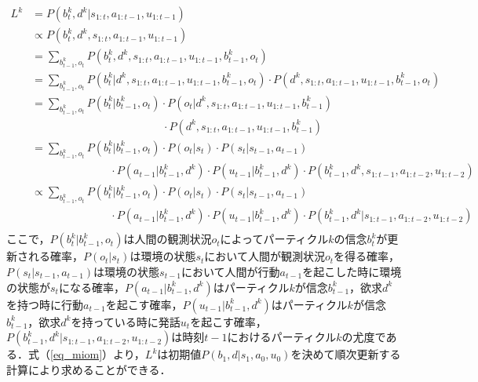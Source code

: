 \begin{equation}
  \begin{split}
  \label{eq_miom}
  L^k&=P(b_t^k,d^k|s_{1:t},a_{1:t-1},u_{1:t-1})\\
  &\propto P(b_t^k,d^k,s_{1:t},a_{1:t-1},u_{1:t-1})\\
  &= \sum_{b_{t-1}^k,o_t}P(b_t^k,d^k,s_{1:t},a_{1:t-1},u_{1:t-1},b_{t-1}^k,o_t)\\
  &= \sum_{b_{t-1}^k,o_t}P(b_t^k|d^k,s_{1:t},a_{1:t-1},u_{1:t-1},b_{t-1}^k,o_t)\cdot P(d^k,s_{1:t},a_{1:t-1},u_{1:t-1},b_{t-1}^k,o_t)\\
  &= \sum_{b_{t-1}^k,o_t}P(b_t^k|b_{t-1}^k,o_t)\cdot P(o_t|d^k,s_{1:t},a_{1:t-1},u_{1:t-1},b_{t-1}^k)\\
  &\hspace{5cm} \cdot P(d^k,s_{1:t},a_{1:t-1},u_{1:t-1},b_{t-1}^k)\\
  &= \sum_{b_{t-1}^k,o_t}P(b_t^k|b_{t-1}^k,o_t)\cdot P(o_t|s_t)\cdot P(s_t|s_{t-1},a_{t-1})\\
  &\hspace{3cm} \cdot P(a_{t-1}|b_{t-1}^k,d^k)\cdot P(u_{t-1}|b_{t-1}^k,d^k)\cdot P(b_{t-1}^k,d^k,s_{1:t-1},a_{1:t-2},u_{1:t-2})\\
  &\propto \sum_{b_{t-1}^k,o_t}P(b_t^k|b_{t-1}^k,o_t)\cdot P(o_t|s_t)\cdot P(s_t|s_{t-1},a_{t-1})\\
  &\hspace{3cm} \cdot P(a_{t-1}|b_{t-1}^k,d^k)\cdot P(u_{t-1}|b_{t-1}^k,d^k)\cdot P(b_{t-1}^k,d^k|s_{1:t-1},a_{1:t-2},u_{1:t-2})\\
  \end{split}
\end{equation}
ここで，$P(b_t^k|b_{t-1}^k,o_t)$は人間の観測状況$o_t$によってパーティクル$k$の信念$b_t^k$が更新される確率，$P(o_t|s_t)$は環境の状態$s_t$において人間が観測状況$o_t$を得る確率，$P(s_t|s_{t-1},a_{t-1})$は環境の状態$s_{t-1}$において人間が行動$a_{t-1}$を起こした時に環境の状態が$s_{t}$になる確率，$P(a_{t-1}|b_{t-1}^k,d^k)$はパーティクル$k$が信念$b_{t-1}^k$，欲求$d^k$を持つ時に行動$a_{t-1}$を起こす確率，$P(u_{t-1}|b_{t-1}^k,d^k)$はパーティクル$k$が信念$b_{t-1}^k$，欲求$d^k$を持っている時に発話$u_t$を起こす確率，$P(b_{t-1}^k,d^k|s_{1:t-1},a_{1:t-2},u_{1:t-2})$は時刻$t-1$におけるパーティクル$k$の尤度である．式（\ref{eq_miom}）より，$L^k$は初期値$P(b_1,d|s_1,a_0,u_0)$を決めて順次更新する計算により求めることができる．

